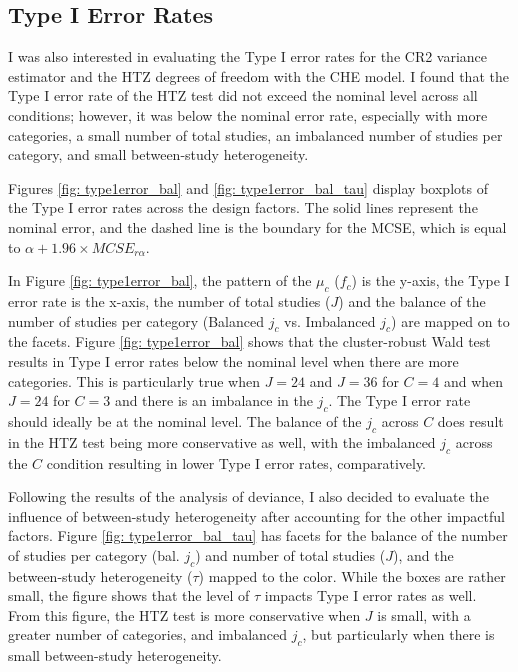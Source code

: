 \subsection{Type I Error Rates}

I was also interested in evaluating the Type I error rates for the CR2 variance estimator and the HTZ degrees of freedom with the CHE model. I found that the Type I error rate of the HTZ test did not exceed the nominal level across all conditions; however, it was below the nominal error rate, especially with more categories, a small number of total studies, an imbalanced number of studies per category, and small between-study heterogeneity. 


Figures \ref{fig: type1error_bal} and \ref{fig: type1error_bal_tau} display boxplots of the Type I error rates across the design factors. The solid lines represent the nominal error, and the dashed line is the boundary for the MCSE, which is equal to $\alpha + 1.96 \times MCSE_{r\alpha}$. 

In Figure \ref{fig: type1error_bal}, the pattern of the $\mu_c$ ($f_c$) is the y-axis, the Type I error rate is the x-axis, the number of total studies ($J$) and the balance of the number of studies per category (Balanced $j_c$ vs. Imbalanced $j_c$) are mapped on to the facets. Figure \ref{fig: type1error_bal} shows that the cluster-robust Wald test results in Type I error rates below the nominal level when there are more categories. This is particularly true when $J = 24$ and $J = 36$ for $C = 4$ and when $J = 24$ for $C = 3$ and there is an imbalance in the $j_c$.  The Type I error rate should ideally be at the nominal level. The balance of the $j_c$ across $C$ does result in the HTZ test being more conservative as well, with the imbalanced $j_c$ across the $C$ condition resulting in lower Type I error rates, comparatively. 

Following the results of the analysis of deviance, I also decided to evaluate the influence of between-study heterogeneity after accounting for the other impactful factors. Figure \ref{fig: type1error_bal_tau} has facets for the balance of the number of studies per category (bal. $j_c$) and number of total studies ($J$), and the between-study heterogeneity ($\tau$)  mapped to the color. While the boxes are rather small, the figure shows that the level of $\tau$ impacts Type I error rates as well. From this figure, the HTZ test is more conservative when $J$ is small, with a greater number of categories, and imbalanced $j_c$, but particularly when there is small between-study heterogeneity.

